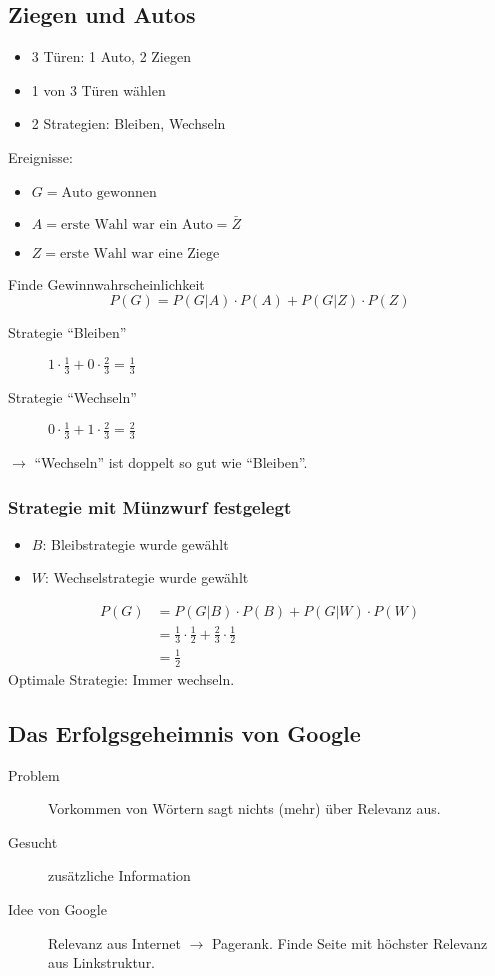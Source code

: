 \documentclass[10pt,a4paper]{scrartcl}
\begin{document}
\subsection{Ziegen und Autos}
\begin{itemize}
\item 3 Türen: 1 Auto, 2 Ziegen
\item 1 von 3 Türen wählen
\item 2 Strategien: Bleiben, Wechseln
\end{itemize}

Ereignisse:
\begin{itemize}
\item $G = \mbox{Auto gewonnen}$
\item $A = \mbox{erste Wahl war ein Auto} = \bar{Z}$
\item $Z = \mbox{erste Wahl war eine Ziege}$
\end{itemize}

Finde Gewinnwahrscheinlichkeit
$$P(G) = P(G|A) \cdot P(A) + P(G|Z) \cdot P(Z)$$
\begin{description}
\item[Strategie ``Bleiben''] $1 \cdot \frac{1}{3} + 0 \cdot \frac{2}{3} = \frac{1}{3}$
\item[Strategie ``Wechseln''] $0 \cdot \frac{1}{3} + 1 \cdot \frac{2}{3} = \frac{2}{3}$
\end{description}
$\rightarrow$ ``Wechseln'' ist doppelt so gut wie ``Bleiben''.

\subsubsection{Strategie mit Münzwurf festgelegt}
\begin{itemize}
\item $B$: Bleibstrategie wurde gewählt
\item $W$: Wechselstrategie wurde gewählt
\end{itemize}
\begin{align*}
P(G) & = P(G|B) \cdot P(B) + P(G|W) \cdot P(W) \\
	& = \frac{1}{3}\cdot\frac{1}{2} + \frac{2}{3}\cdot\frac{1}{2} \\
    & = \frac{1}{2}
\end{align*}
Optimale Strategie: Immer wechseln.

\subsection{Das Erfolgsgeheimnis von Google}
\begin{description}
\item[Problem] Vorkommen von Wörtern sagt nichts (mehr) über Relevanz aus.
\item[Gesucht] zusätzliche Information
\item[Idee von Google] Relevanz aus Internet $\rightarrow$ Pagerank. Finde Seite mit höchster Relevanz aus Linkstruktur.
\end{description}
\end{document}
